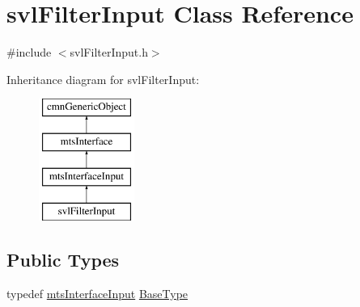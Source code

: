 \hypertarget{classsvl_filter_input}{}\section{svl\+Filter\+Input Class Reference}
\label{classsvl_filter_input}


{\ttfamily \#include $<$svl\+Filter\+Input.\+h$>$}

Inheritance diagram for svl\+Filter\+Input\+:\begin{figure}[H]
\begin{center}
\leavevmode
\includegraphics[height=4.000000cm]{d9/d80/classsvl_filter_input}
\end{center}
\end{figure}
\subsection*{Public Types}
\begin{DoxyCompactItemize}
\item 
typedef \hyperlink{classmts_interface_input}{mts\+Interface\+Input} \hyperlink{classsvl_filter_input_a1439c55646b38d500a6eaf9a761bf5a2}{Base\+Type}
\end{DoxyCompactItemize}
